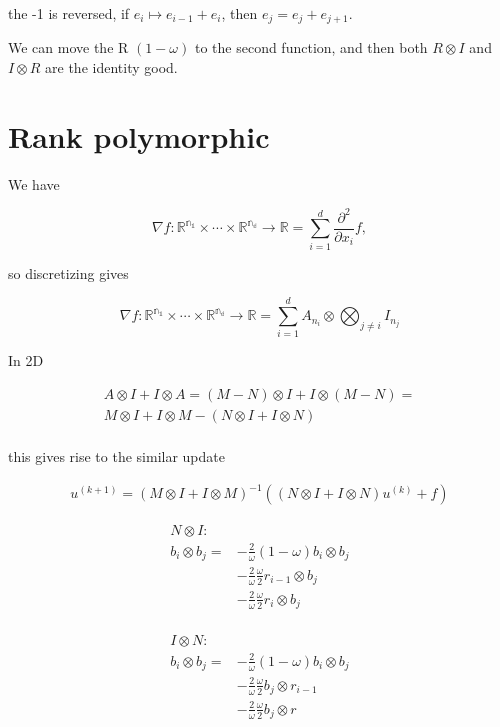 \documentclass{article}
\begin{document}
the -1 is reversed, if $e_{i} \mapsto e_{i - 1} + e_i$, then
$e_{j} = e_{j} + e_{j + 1}$. 

We can move the R $(1 - \omega)$ to the second function, and then both 
$R \otimes I$ and $I \otimes R$ are the identity good.

\section{Rank polymorphic}

We have

\[
\nabla f: \mathbb{R^{n_1}} \times \cdots \times \mathbb{R^{n_d}} \to \mathbb{R} 
= \sum_{i = 1}^{d} \frac{\partial^2}{\partial x_i} f,
\]

so discretizing gives

\[
\nabla f: \mathbb{R^{n_1}} \times \cdots \times \mathbb{R^{n_d}} \to \mathbb{R} 
= \sum_{i = 1}^d A_{n_i} \otimes \bigotimes_{j \neq i} I_{n_j}
\]

In 2D

\begin{align*}
    A \otimes I + I \otimes A = (M - N) \otimes I + I \otimes (M - N) = \\
    M \otimes I + I \otimes M - (N \otimes I + I \otimes N) \\
\end{align*}

this gives rise to the similar update

\begin{align*}
    u^{(k + 1)} = (M \otimes I + I \otimes M)^{-1} 
            \left((N \otimes I + I \otimes N)u^{(k)} + f \right)
\end{align*}

\begin{align*}
    N \otimes I: & \\
    b_i \otimes b_j = & -\frac{2}{\omega}(1 - \omega)b_i \otimes b_j            \\
                      & -\frac{2}{\omega}\frac{\omega}{2} r_{i - 1} \otimes b_j \\
                      & -\frac{2}{\omega}\frac{\omega}{2} r_i       \otimes b_j \\
\end{align*}

\begin{align*}
    I \otimes N: & \\
    b_i \otimes b_j = & -\frac{2}{\omega}(1 - \omega)b_i \otimes b_j            \\
                      & -\frac{2}{\omega}\frac{\omega}{2} b_j \otimes r_{i - 1} \\
                      & -\frac{2}{\omega}\frac{\omega}{2} b_j \otimes r         \\
\end{align*}
\end{document}

